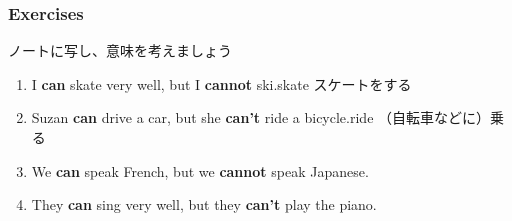 \documentclass[aspectratio=169,xcolor={dvipsnames,table}]{beamer}
\newcommand{\myaudio}[1]{\href{#1}{\faVolumeUp}}
\begin{document}
\begin{frame}[plain]\frametitle{Exercises}
 ノートに写し、意味を考えましょう

\begin{enumerate}
 \item I {\bfseries can} skate very well, but I {\bfseries cannot} ski.\hfill{\scriptsize skate  スケートをする}
 \item Suzan {\bfseries can} drive a car, but she {\bfseries can't} ride a bicycle.\hfill{\scriptsize ride  （自転車などに）乗る}
 \item We {\bfseries can} speak French, but we {\bfseries cannot} speak Japanese.
 \item They {\bfseries can} sing very well, but they {\bfseries can't} play the piano.
\end{enumerate}
\vfill


\hfill{}

\mbox{}\hfill{\myaudio{./audio/012_can_05.mp3}}
\end{frame}
\end{document}
